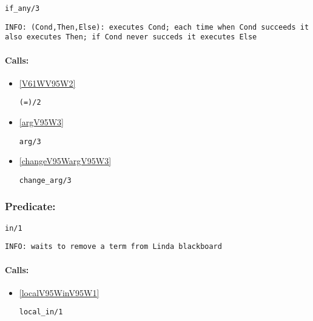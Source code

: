 \begin{verbatim}
if_any/3
\end{verbatim}

{\small \begin{verbatim}
INFO: (Cond,Then,Else): executes Cond; each time when Cond succeeds it also executes Then; if Cond never succeds it executes Else

\end{verbatim}}
\paragraph{Calls:} 
\begin{itemize}
\item \ref{V61WV95W2} 
\begin{verbatim}
(=)/2
\end{verbatim}

\item \ref{argV95W3} 
\begin{verbatim}
arg/3
\end{verbatim}

\item \ref{changeV95WargV95W3} 
\begin{verbatim}
change_arg/3
\end{verbatim}

\end{itemize}

\subsubsection{Predicate:} \label{inV95W1}

\begin{verbatim}
in/1
\end{verbatim}

{\small \begin{verbatim}
INFO: waits to remove a term from Linda blackboard

\end{verbatim}}
\paragraph{Calls:} 
\begin{itemize}
\item \ref{localV95WinV95W1} 
\begin{verbatim}
local_in/1
\end{verbatim}

\end{itemize}

